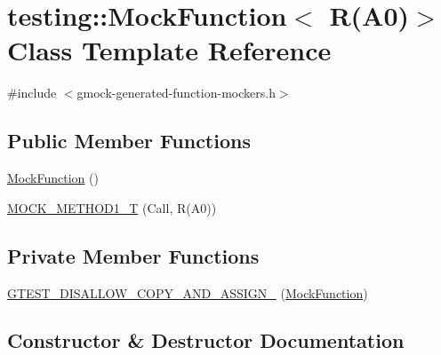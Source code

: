 \hypertarget{classtesting_1_1_mock_function_3_01_r_07_a0_08_4}{}\section{testing\+::Mock\+Function$<$ R(A0)$>$ Class Template Reference}
\label{classtesting_1_1_mock_function_3_01_r_07_a0_08_4}


{\ttfamily \#include $<$gmock-\/generated-\/function-\/mockers.\+h$>$}

\subsection*{Public Member Functions}
\begin{DoxyCompactItemize}
\item 
\mbox{\hyperlink{classtesting_1_1_mock_function_3_01_r_07_a0_08_4_a716abd3e67561edb8e431ffa55c4835d}{Mock\+Function}} ()
\item 
\mbox{\hyperlink{classtesting_1_1_mock_function_3_01_r_07_a0_08_4_a6a22e7e14b53d2df30bef4404b41fade}{M\+O\+C\+K\+\_\+\+M\+E\+T\+H\+O\+D1\+\_\+T}} (Call, R(A0))
\end{DoxyCompactItemize}
\subsection*{Private Member Functions}
\begin{DoxyCompactItemize}
\item 
\mbox{\hyperlink{classtesting_1_1_mock_function_3_01_r_07_a0_08_4_a750f5e7990ed0ad79801448c5fbb30d3}{G\+T\+E\+S\+T\+\_\+\+D\+I\+S\+A\+L\+L\+O\+W\+\_\+\+C\+O\+P\+Y\+\_\+\+A\+N\+D\+\_\+\+A\+S\+S\+I\+G\+N\+\_\+}} (\mbox{\hyperlink{classtesting_1_1_mock_function}{Mock\+Function}})
\end{DoxyCompactItemize}


\subsection{Constructor \& Destructor Documentation}
\mbox{\label{classtesting_1_1_mock_function_3_01_r_07_a0_08_4_a716abd3e67561edb8e431ffa55c4835d}} 
